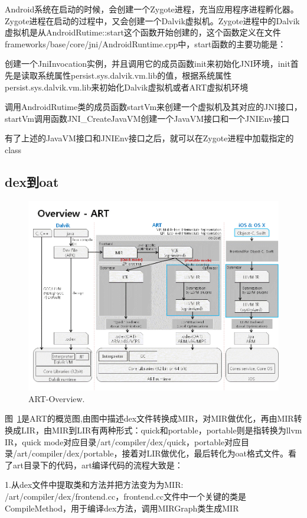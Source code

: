 Android系统在启动的时候，会创建一个Zygote进程，充当应用程序进程孵化器。Zygote进程在启动的过程中，又会创建一个Dalvik虚拟机。Zygote进程中的Dalvik虚拟机是从AndroidRutime::start这个函数开始创建的，这个函数定义在文件frameworks/base/core/jni/AndroidRuntime.cpp中，start函数的主要功能是：
       
创建一个JniInvocation实例，并且调用它的成员函数init来初始化JNI环境，init首先是读取系统属性persist.sys.dalvik.vm.lib的值，根据系统属性persist.sys.dalvik.vm.lib来初始化Dalvik虚拟机或者ART虚拟机环境

调用AndroidRutime类的成员函数startVm来创建一个虚拟机及其对应的JNI接口，startVm调用函数JNI\_CreateJavaVM创建一个JavaVM接口和一个JNIEnv接口

有了上述的JavaVM接口和JNIEnv接口之后，就可以在Zygote进程中加载指定的class
\subsection{dex到oat}
\begin{figure}[hbpt]
\centering
\includegraphics[width=\textwidth]{img/art-overview.png}
\caption{ART-Overview.}
\label{fig:art:overview}
\end{figure}
图~\ref{fig:art:overview}是ART的概览图,由图中描述dex文件转换成MIR，对MIR做优化，再由MIR转换成LIR，由MIR到LIR有两种形式：quick和portable，portable则是指转换为llvm IR，quick mode对应目录/art/compiler/dex/quick，portable对应目录/art/compiler/dex/portable，接着对LIR做优化，最后转化为oat格式文件。看了art目录下的代码，art编译代码的流程大致是：

1.从dex文件中提取类和方法并把方法变为为MIR: /art/compiler/dex/frontend.cc，frontend.cc文件中一个关键的类是CompileMethod，用于编译dex方法，调用MIRGraph类生成MIR
 
